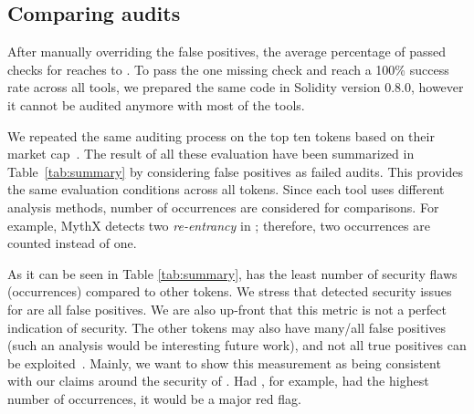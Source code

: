 
\subsection{Comparing audits}
After manually overriding the false positives, the average percentage of passed checks for \sys reaches to \prct. To pass the one missing check and reach a 100\% success rate across all tools, we prepared the same code in Solidity version 0.8.0, however it cannot be audited anymore with most of the tools. 

We repeated the same auditing process on the top ten tokens based on their market cap~\cite{EtherScan}. The result of all these evaluation have been summarized in Table~\ref{tab:summary} by considering false positives as failed audits. This provides the same evaluation conditions across all tokens. Since each tool uses different analysis methods, number of occurrences are considered for comparisons. For example, MythX detects two \textit{re-entrancy} in \sys; therefore, two occurrences are counted instead of one. 


As it can be seen in Table \ref{tab:summary}, \sys has the least number of security flaws (occurrences) compared to other tokens. We stress that detected security issues for \sys are all false positives. We are also up-front that this metric is not a perfect indication of security.  The other tokens may also have many/all false positives (such an analysis would be interesting future work), and not all true positives can be exploited~\cite{VulExp}. Mainly, we want to show this measurement as being consistent with our claims around the security of \sys. Had \sys, for example, had the highest number of occurrences, it would be a major red flag.



